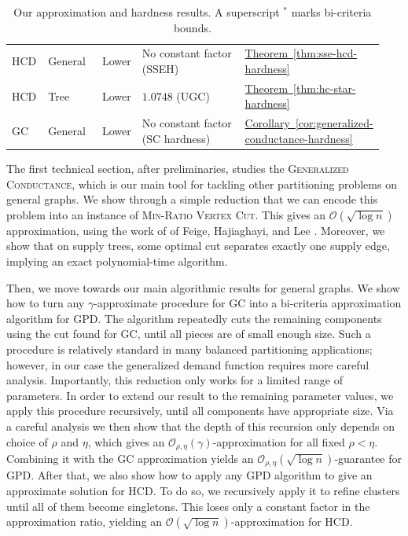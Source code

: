 \begin{table}[t]
\begin{tabular}{p{0.10\linewidth}p{0.16\linewidth}p{0.08\linewidth}p{0.40\linewidth}p{0.20\linewidth}}
\textsc{HCD} & General & Lower & No constant factor (SSEH) & \hyperref[thm:sse-hcd-hardness]{Theorem~\ref*{thm:sse-hcd-hardness}} \\
\textsc{HCD} & Tree & Lower & $1.0748$ (UGC) & \hyperref[thm:hc-star-hardness]{Theorem~\ref*{thm:hc-star-hardness}} \\
\textsc{GC} & General & Lower & No constant factor (SC hardness) & \hyperref[cor:generalized-conductance-hardness]{Corollary~\ref*{cor:generalized-conductance-hardness}} \\
\hline
\end{tabular}
\caption{Our approximation and hardness results. A superscript $^*$ marks bi-criteria bounds.}
\label{tab:main-results}
\end{table}

The first technical section, after preliminaries, studies the \textsc{Generalized Conductance}, which is our main tool for tackling other partitioning problems on general graphs. We show through a simple reduction that we can encode this problem into an instance of \textsc{Min-Ratio Vertex Cut}. This gives an $\mathcal{O}(\sqrt{\log n})$ approximation, using the work of of Feige, Hajiaghayi, and Lee \cite{ImprovedApproximationAlgorithmsForMinimumWeightVertexSeparators}. Moreover, 
we show that on supply trees, some optimal cut separates exactly one supply edge, implying an exact polynomial-time algorithm. 

Then, we move towards our main algorithmic results for general graphs. We show how to turn any $\gamma$-approximate procedure for GC into a bi-criteria approximation algorithm for GPD. The algorithm repeatedly cuts the remaining components using the cut found for GC, until all pieces are of small enough size.
 Such a procedure is relatively standard in many balanced partitioning applications; however, in our case the generalized demand function requires more careful analysis. Importantly, this reduction only works for a limited range of parameters. In order to extend our result to the remaining parameter values, we apply this procedure recursively, until all components have appropriate size. Via a careful analysis we then show that the depth of this recursion only depends on choice of $\rho$ and $\eta$, which gives an $\mathcal{O}_{\rho,\eta}(\gamma)$-approximation for all fixed $\rho<\eta$. Combining it with the GC approximation yields an $\mathcal{O}_{\rho,\eta}(\sqrt{\log n})$-guarantee for GPD.
After that, we also show how to apply any GPD algorithm to give an approximate solution for HCD. To do so, we recursively apply it to refine clusters until all of them become singletons. This loses only a constant factor in the approximation ratio, yielding an $\mathcal{O}(\sqrt{\log n})$-approximation for HCD.

